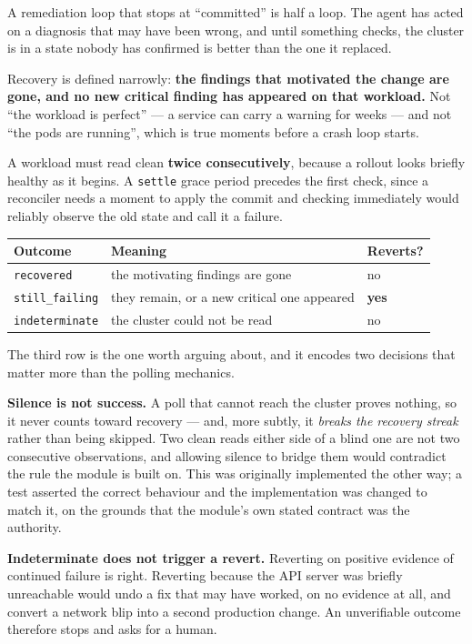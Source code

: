 \documentclass[11pt,a4paper]{article}
\newcommand{\code}[1]{\texttt{\small #1}}
\begin{document}
A remediation loop that stops at ``committed'' is half a loop. The agent has
acted on a diagnosis that may have been wrong, and until something checks, the
cluster is in a state nobody has confirmed is better than the one it replaced.

Recovery is defined narrowly: \textbf{the findings that motivated the change are
gone, and no new critical finding has appeared on that workload.} Not ``the
workload is perfect'' --- a service can carry a warning for weeks --- and not
``the pods are running'', which is true moments before a crash loop starts.

A workload must read clean \textbf{twice consecutively}, because a rollout looks
briefly healthy as it begins. A \code{settle} grace period precedes the first
check, since a reconciler needs a moment to apply the commit and checking
immediately would reliably observe the old state and call it a failure.

\begin{table}[h]
\centering
\small
\begin{tabularx}{\textwidth}{@{}l X l@{}}
\toprule
\textbf{Outcome} & \textbf{Meaning} & \textbf{Reverts?} \\
\midrule
\code{recovered}     & the motivating findings are gone                & no \\
\code{still\_failing}& they remain, or a new critical one appeared     & \textbf{yes} \\
\code{indeterminate} & the cluster could not be read                   & no \\
\bottomrule
\end{tabularx}
\end{table}

The third row is the one worth arguing about, and it encodes two decisions that
matter more than the polling mechanics.

\textbf{Silence is not success.} A poll that cannot reach the cluster proves
nothing, so it never counts toward recovery --- and, more subtly, it \emph{breaks
the recovery streak} rather than being skipped. Two clean reads either side of a
blind one are not two consecutive observations, and allowing silence to bridge
them would contradict the rule the module is built on. This was originally
implemented the other way; a test asserted the correct behaviour and the
implementation was changed to match it, on the grounds that the module's own
stated contract was the authority.

\textbf{Indeterminate does not trigger a revert.} Reverting on positive evidence
of continued failure is right. Reverting because the API server was briefly
unreachable would undo a fix that may have worked, on no evidence at all, and
convert a network blip into a second production change. An unverifiable outcome
therefore stops and asks for a human.
\end{document}
